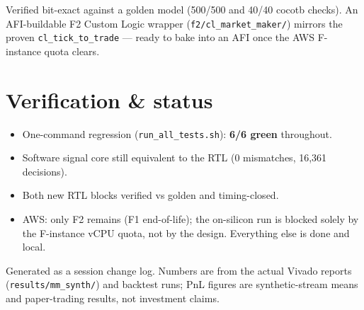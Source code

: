 \documentclass[10pt,a4paper]{article}
\newcommand{\code}[1]{\texttt{\small #1}}
\begin{document}
Verified bit-exact against a golden model (500/500 and 40/40 cocotb checks). An
AFI-buildable F2 Custom Logic wrapper (\code{f2/cl\_market\_maker/}) mirrors the proven
\code{cl\_tick\_to\_trade} — ready to bake into an AFI once the AWS F-instance quota clears.

\section{Verification \& status}
\begin{itemize}[leftmargin=1.4em, itemsep=1pt]
  \item One-command regression (\code{run\_all\_tests.sh}): \textbf{6/6 green} throughout.
  \item Software signal core still equivalent to the RTL (0 mismatches, 16{,}361 decisions).
  \item Both new RTL blocks verified vs golden and timing-closed.
  \item AWS: only F2 remains (F1 end-of-life); the on-silicon run is blocked solely by the
  F-instance vCPU quota, not by the design. Everything else is done and local.
\end{itemize}

\vfill
{\small\color{rulegray} Generated as a session change log. Numbers are from the actual
Vivado reports (\code{results/mm\_synth/}) and backtest runs; PnL figures are synthetic-stream
means and paper-trading results, not investment claims.}
\end{document}

